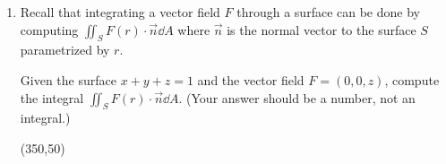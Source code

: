 \documentclass[12pt]{exam}
\begin{document}
\begin{enumerate}
\newpage
\item Recall that integrating a vector field $F$ through a surface can be done by computing $\iint_{S} F(r)\cdot\vec{n}\dd A$ where $\vec{n}$ is the normal vector to the surface $S$ parametrized by $r$.\par
Given the surface $x+y+z=1$ and the vector field $F=(0,0,z)$, compute the integral $\iint_{S} F(r)\cdot\vec{n}\dd A$. (Your answer should be a number, not an integral.)
\begin{flushleft}
\end{flushleft}
\vfill
\begin{flushright}
\framebox(350,50){}
\end{flushright}

\end{enumerate}
\end{document}

